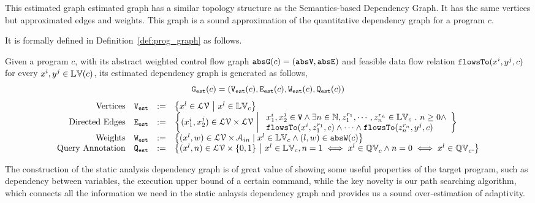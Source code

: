 This estimated graph estimated graph has a similar topology structure as 
the Semantics-based Dependency Graph. It has the same
vertices 
but approximated edges and weights.  
This graph is a sound approximation of the quantitative dependency graph for a program $c$.

It is formally defined in Definition~\ref{def:prog_graph} as follows.
\begin{defn}
  \label{def:prog_graph}
Given a program $c$, with its abstract weighted control flow graph $\mathtt{abs}{\mathtt{G}}(c) = (\mathtt{abs}{\mathtt{V}}, \mathtt{abs}{\mathtt{E}})$ and 
feasible data flow relation $\mathtt{flowsTo}(x^i, y^j, c)$ for every $x^i, y^j \in \mathbb{LV}(c)$, its estimated dependency graph
is generated as follows,
$$\mathtt{{G_{est}}}(c) = (\mathtt{{V_{est}}}(c), \mathtt{{E_{est}}}(c), \mathtt{{W_{est}}}(c), \mathtt{{Q_{est}}}(c))$$
{\footnotesize
\[
\begin{array}{rlcl}
\text{Vertices} &
\progV & := & \left\{ 
x^l \in \mathcal{LV} 
~ \middle\vert ~
x^l \in \lvar_{c}
\right\}
\\
\text{Directed Edges} &
\progE & := & 
\left\{ 
({x}_1^{i}, {x}_2^{j}) \in \mathcal{LV} \times \mathcal{LV}
~ \middle\vert ~
\begin{array}{l}
  {x}_1^{i}, {x}_2^{j} \in \vertxs
\land
  \exists n \in \mathbb{N}, z_1^{r_1}, \cdots, z_n^{r_n} \in \lvar_{{c}} \st 
  n \geq 0 \land
  \\
  \flowsto(x^i,  z_1^{r_1}, c) 
  \land \cdots \land \flowsto(z_n^{r_n}, y^j, c) 
\end{array}
\right\}
\\
\text{Weights} &
\progW & := &
\left\{ (x^l, w) \in  \mathcal{LV} \times \mathcal{A}_{in}
\mid
x^l \in \lvar_{{c}} \land (l, w) \in \absW(c)
\right\}
\\
\text{Query Annotation} &
\progF & := & 
\left\{(x^l, n)  \in  \mathcal{LV} \times \{0, 1\} 
~ \middle\vert ~
x^l \in \lvar_{c},
n = 1 \iff x^l \in \qvar_{c} \land n = 0 \iff  x^l \in \qvar_{c} .
\right\}
\end{array}
\] }
\end{defn}
The construction of the static analysis dependency graph is of great value of showing some useful properties of the target program,
such as dependency between variables, the execution upper bound of a certain command,
while the key novelty is our path searching algorithm, which connects all the information we need in the static anlaysis dependency graph and provides us a sound over-estimation of adaptivity.

